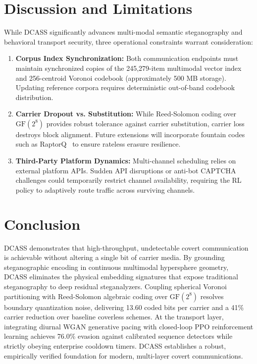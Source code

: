 \documentclass[conference]{IEEEtran}
\begin{document}
\section{Discussion and Limitations}

While DCASS significantly advances multi-modal semantic steganography and behavioral transport security, three operational constraints warrant consideration:
\begin{enumerate}
    \item \textbf{Corpus Index Synchronization:} Both communication endpoints must maintain synchronized copies of the 245,279-item multimodal vector index and 256-centroid Voronoi codebook (approximately 500 MB storage). Updating reference corpora requires deterministic out-of-band codebook distribution.
    \item \textbf{Carrier Dropout vs. Substitution:} While Reed-Solomon coding over $\text{GF}(2^8)$ provides robust tolerance against carrier substitution, carrier loss destroys block alignment. Future extensions will incorporate fountain codes such as RaptorQ~\cite{luby2002lt} to ensure rateless erasure resilience.
    \item \textbf{Third-Party Platform Dynamics:} Multi-channel scheduling relies on external platform APIs. Sudden API disruptions or anti-bot CAPTCHA challenges could temporarily restrict channel availability, requiring the RL policy to adaptively route traffic across surviving channels.
\end{enumerate}

\section{Conclusion}

DCASS demonstrates that high-throughput, undetectable covert communication is achievable without altering a single bit of carrier media. By grounding steganographic encoding in continuous multimodal hypersphere geometry, DCASS eliminates the physical embedding signatures that expose traditional steganography to deep residual steganalyzers. Coupling spherical Voronoi partitioning with Reed-Solomon algebraic coding over $\text{GF}(2^8)$ resolves boundary quantization noise, delivering 13.60 coded bits per carrier and a 41\% carrier reduction over baseline coverless schemes. At the transport layer, integrating diurnal WGAN generative pacing with closed-loop PPO reinforcement learning achieves 76.0\% evasion against calibrated sequence detectors while strictly obeying enterprise cooldown timers. DCASS establishes a robust, empirically verified foundation for modern, multi-layer covert communications.



\end{document}

